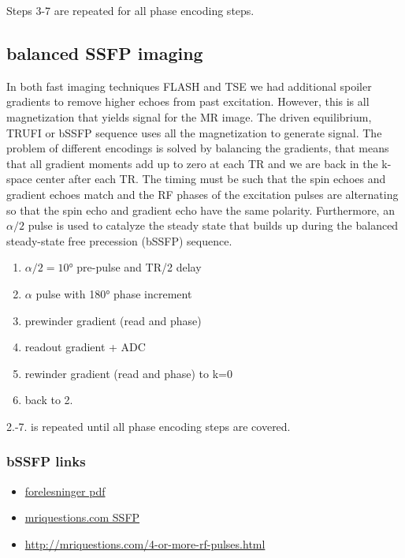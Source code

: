 \documentclass[a4paper,12pt]{extarticle}
\begin{document}
Steps 3-7 are repeated for all phase encoding steps.



\subsection{balanced SSFP imaging}
In both fast imaging techniques FLASH and TSE we had additional spoiler gradients to remove higher echoes from past excitation. However, this is all magnetization that yields signal for the MR image. The driven equilibrium, TRUFI or bSSFP sequence uses all the magnetization to generate signal. The problem of different encodings is solved by balancing the gradients, that means that all gradient moments add up to zero at each TR and we are back in the k-space center after each TR. The timing must be such that the spin echoes and gradient echoes match and the RF phases of the excitation pulses are alternating so that the spin echo and gradient echo  have the same polarity. Furthermore, an $\alpha/2$ pulse is used to catalyze the steady state that builds up during the balanced steady-state free precession (bSSFP) sequence.


\begin{enumerate}
\item $\alpha/2=10$° pre-pulse and TR/2 delay
\item $\alpha$ pulse with 180° phase increment
\item prewinder gradient (read and phase)
\item readout gradient + ADC
\item rewinder gradient (read and phase) to k=0
\item back to 2.
\end{enumerate}
2.-7. is repeated until all phase encoding steps are covered.


\subsubsection{bSSFP links}
\begin{itemize}
\item \href{https://www.uio.no/studier/emner/matnat/fys/FYS-KJM4740/v10/undervisningsmateriale/forelesninger-ppts/FYS-KJM_4740_Chap5-6_100406_print.pdf}{forelesninger pdf} 
\item \href{http://mriquestions.com/what-is-ssfp.html}{mriquestions.com SSFP}
\item \href{http://mriquestions.com/4-or-more-rf-pulses.html}{http://mriquestions.com/4-or-more-rf-pulses.html}
\end{itemize}
\clearpage 
\newpage
\end{document}
